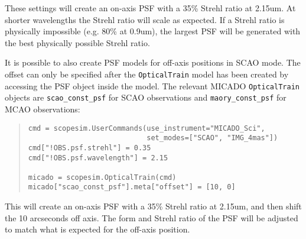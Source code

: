 These settings will create an on-axis PSF with a 35\% Strehl ratio at 2.15um.
At shorter wavelengths the Strehl ratio will scale as expected.
If a Strehl ratio is physically impossible (e.g. 80\% at 0.9um), the largest PSF will be generated with the best physically possible Strehl ratio.

It is possible to also create PSF models for off-axis positions in SCAO mode.
The offset can only be specified after the \texttt{OpticalTrain} model has been created by accessing the PSF object inside the model.
The relevant MICADO \texttt{OpticalTrain} objects are \texttt{scao\_const\_psf} for SCAO observations and \texttt{maory\_const\_psf} for MCAO observations:

\begin{quote}
\begin{alltt}
\begin{lstlisting}[frame=single]
cmd = scopesim.UserCommands(use_instrument="MICADO_Sci",
                            set_modes=["SCAO", "IMG_4mas"])
cmd["!OBS.psf.strehl"] = 0.35
cmd["!OBS.psf.wavelength"] = 2.15

micado = scopesim.OpticalTrain(cmd)
micado["scao_const_psf"].meta["offset"] = [10, 0]
\end{lstlisting}
\end{alltt}
\end{quote}

This will create an on-axis PSF with a 35\% Strehl ratio at 2.15um, and then shift the 10 arcseconds off axis.
The form and Strehl ratio of the PSF will be adjusted to match what is expected for the off-axis position.


